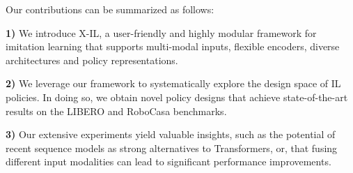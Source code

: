 

Our contributions can be summarized as follows:

\textbf{1)} We introduce X-IL, a user-friendly and highly modular framework for imitation learning that supports multi-modal inputs, flexible encoders, diverse architectures and policy representations.

\textbf{2)} We leverage our framework to systematically explore the design space of IL policies. In doing so, we obtain novel policy designs that achieve state-of-the-art results on the LIBERO \cite{liu2023liberobenchmarkingknowledgetransfer} and RoboCasa \cite{nasiriany2024robocasalargescalesimulationeveryday} benchmarks. 
 
\textbf{3)} Our extensive experiments yield valuable insights, such as the potential of recent sequence models as strong alternatives to Transformers, or, that fusing different input modalities can lead to significant performance improvements.

